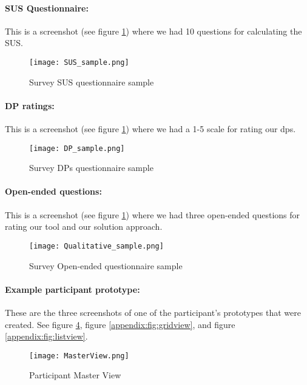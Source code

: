 \paragraph{SUS Questionnaire:} This is a screenshot (see figure \ref{appendix:fig:sus_sample}) where we had 10 questions for calculating the SUS. 
\begin{figure}[ht]
    \centering
    \texttt{[image: SUS\_sample.png]}
    \caption[SUS questionnaire]{Survey SUS questionnaire sample}
    \label{appendix:fig:sus_sample}
\end{figure}

\paragraph{DP ratings:} This is a screenshot (see figure \ref{appendix:fig:sus_sample}) where we had a 1-5 scale for rating our \ac{dp}s. 
\begin{figure}[ht]
    \centering
    \texttt{[image: DP\_sample.png]}
    \caption[DPs questionnaire]{Survey DPs questionnaire sample}
    \label{appendix:fig:dps_sample}
\end{figure}

\paragraph{Open-ended questions:} This is a screenshot (see figure \ref{appendix:fig:sus_sample}) where we had three open-ended questions for rating our tool and our solution approach. 
\begin{figure}[ht]
    \centering
    \texttt{[image: Qualitative\_sample.png]}
    \caption[Open-ended questionnaire]{Survey Open-ended questionnaire sample}
    \label{appendix:fig:qualitative_sample}
\end{figure}

\paragraph{Example participant prototype:} These are the three screenshots of one of the participant's prototypes that were created. See figure \ref{appendix:fig:masterview}, figure \ref{appendix:fig:gridview}, and figure \ref{appendix:fig:listview}.
\begin{figure}[ht]
    \centering
    \texttt{[image: MasterView.png]}
    \caption[Example prototype]{Participant Master View}
    \label{appendix:fig:masterview}
\end{figure}

